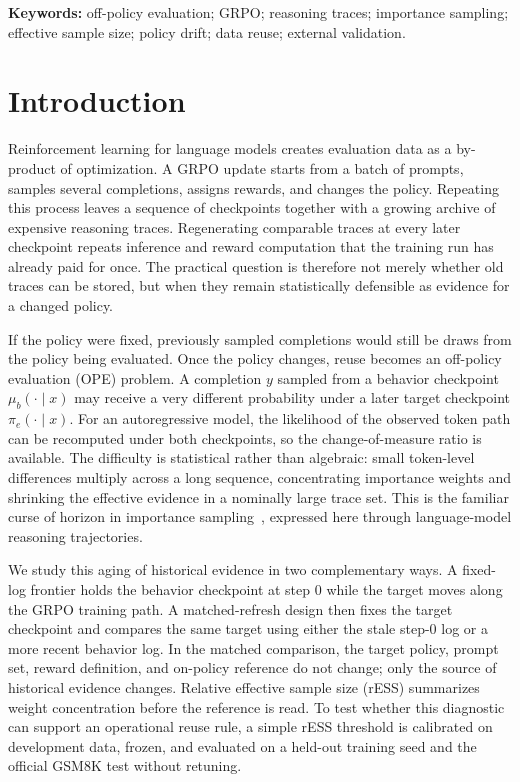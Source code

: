 \documentclass[10pt]{article}
\theoremstyle{remark}
\begin{document}
\noindent\textbf{Keywords:} off-policy evaluation; GRPO; reasoning traces; importance sampling; effective sample size; policy drift; data reuse; external validation.

\section{Introduction}
Reinforcement learning for language models creates evaluation data as a by-product of optimization. A GRPO update starts from a batch of prompts, samples several completions, assigns rewards, and changes the policy. Repeating this process leaves a sequence of checkpoints together with a growing archive of expensive reasoning traces. Regenerating comparable traces at every later checkpoint repeats inference and reward computation that the training run has already paid for once. The practical question is therefore not merely whether old traces can be stored, but when they remain statistically defensible as evidence for a changed policy.

If the policy were fixed, previously sampled completions would still be draws from the policy being evaluated. Once the policy changes, reuse becomes an off-policy evaluation (OPE) problem. A completion $y$ sampled from a behavior checkpoint $\mu_b(\cdot\mid x)$ may receive a very different probability under a later target checkpoint $\pi_e(\cdot\mid x)$. For an autoregressive model, the likelihood of the observed token path can be recomputed under both checkpoints, so the change-of-measure ratio is available. The difficulty is statistical rather than algebraic: small token-level differences multiply across a long sequence, concentrating importance weights and shrinking the effective evidence in a nominally large trace set. This is the familiar curse of horizon in importance sampling~\cite{liu2020horizon}, expressed here through language-model reasoning trajectories.

We study this aging of historical evidence in two complementary ways. A fixed-log frontier holds the behavior checkpoint at step 0 while the target moves along the GRPO training path. A matched-refresh design then fixes the target checkpoint and compares the same target using either the stale step-0 log or a more recent behavior log. In the matched comparison, the target policy, prompt set, reward definition, and on-policy reference do not change; only the source of historical evidence changes. Relative effective sample size (rESS) summarizes weight concentration before the reference is read. To test whether this diagnostic can support an operational reuse rule, a simple rESS threshold is calibrated on development data, frozen, and evaluated on a held-out training seed and the official GSM8K test without retuning.
\end{document}
